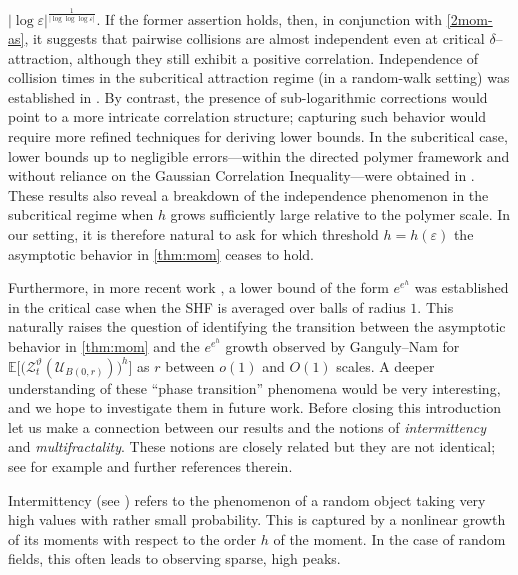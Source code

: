 \documentclass[a4paper,reqno,11pt]{amsart}
\numberwithin{equation}{section}
\theoremstyle{mytheorem}
\newcommand{\bbE}{{\ensuremath{\mathbb E}} }
\newcommand{\cU}{{\ensuremath{\mathcal U}} }
\renewcommand{\epsilon}{\varepsilon}
\renewcommand{\theta}{\vartheta}
\begin{document}
$|\log \epsilon|^{\frac{1}{|\log\log\log \epsilon|}}$.
If the former assertion holds, then, in conjunction with \eqref{2mom-as}, it suggests that pairwise collisions are almost independent even at critical $\delta$–attraction, although they still exhibit a positive correlation. Independence of collision times in the subcritical attraction regime (in a random-walk setting) was established in \cite{LZ24}.
By contrast, the presence of sub-logarithmic corrections would point to a more intricate correlation structure; capturing such behavior would require more refined techniques for deriving lower bounds. In the subcritical case, lower bounds up to negligible errors—within the directed polymer framework and without reliance on the Gaussian Correlation Inequality—were obtained in \cite{CZ24}. These results also reveal a breakdown of the independence phenomenon in the subcritical regime when $h$ grows sufficiently large relative to the polymer scale.
In our setting, it is therefore natural to ask for which threshold $h = h(\varepsilon)$ the asymptotic behavior in \eqref{thm:mom} ceases to hold.

Furthermore, in more recent work \cite{GN25}, a lower bound of the form $e^{e^{h}}$ was established in the critical case when the SHF is averaged over balls of radius $1$. This naturally raises the question of identifying the transition between the asymptotic behavior in \eqref{thm:mom} and the $e^{e^{h}}$ growth observed by Ganguly–Nam for 
$\bbE\Big[ \Big( \mathscr{Z}_{t}^\theta(\cU_{B(0,r)}) \Big)^h\Big]$ as $r$ between 
 $o(1)$ and $O(1)$ scales.
A deeper understanding of these “phase transition” phenomena would be very interesting, and we hope to investigate them in future work.
\vskip 2mm
Before closing this introduction let us make a connection between our results and the notions of
{\it intermittency} and  {\it multifractality}. These notions are closely related but they are not identical; 
see for example \cite{KKX17} and further references therein.

Intermittency (see \cite{CM94})
 refers to the phenomenon of a random object taking very high values with rather small probability. This is
 captured by a nonlinear growth of its moments with respect to the order $h$ of the moment. 
In the case of random fields, this often leads to observing sparse, high peaks. 
\end{document}
